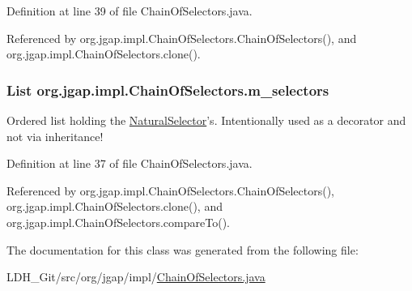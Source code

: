 Definition at line 39 of file Chain\-Of\-Selectors.\-java.



Referenced by org.\-jgap.\-impl.\-Chain\-Of\-Selectors.\-Chain\-Of\-Selectors(), and org.\-jgap.\-impl.\-Chain\-Of\-Selectors.\-clone().

\hypertarget{classorg_1_1jgap_1_1impl_1_1_chain_of_selectors_a246b1875379b6215222b201c838ddd1c}{
\subsubsection[{m\-\_\-selectors}]{\setlength{\rightskip}{0pt plus 5cm}List org.\-jgap.\-impl.\-Chain\-Of\-Selectors.\-m\-\_\-selectors\hspace{0.3cm}{\ttfamily [private]}}}\label{classorg_1_1jgap_1_1impl_1_1_chain_of_selectors_a246b1875379b6215222b201c838ddd1c}
Ordered list holding the \hyperlink{classorg_1_1jgap_1_1_natural_selector}{Natural\-Selector}'s. Intentionally used as a decorator and not via inheritance! 

Definition at line 37 of file Chain\-Of\-Selectors.\-java.



Referenced by org.\-jgap.\-impl.\-Chain\-Of\-Selectors.\-Chain\-Of\-Selectors(), org.\-jgap.\-impl.\-Chain\-Of\-Selectors.\-clone(), and org.\-jgap.\-impl.\-Chain\-Of\-Selectors.\-compare\-To().



The documentation for this class was generated from the following file\-:\begin{DoxyCompactItemize}
\item 
L\-D\-H\-\_\-\-Git/src/org/jgap/impl/\hyperlink{_chain_of_selectors_8java}{Chain\-Of\-Selectors.\-java}\end{DoxyCompactItemize}
